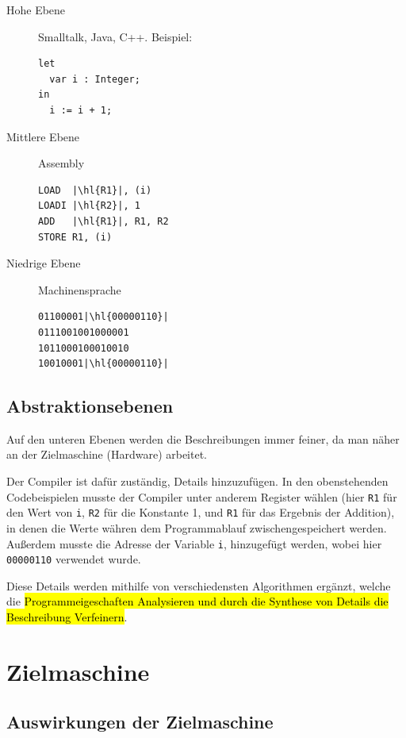 \documentclass[ngerman,abstract=true]{scrartcl}
\begin{document}
\begin{description}
\item[Hohe Ebene] Smalltalk, Java, C++. Beispiel:
\begin{lstlisting}
let
  var i : Integer;
in
  i := i + 1;
\end{lstlisting}
\item[Mittlere Ebene] Assembly
\begin{lstlisting}
LOAD  |\hl{R1}|, (i)
LOADI |\hl{R2}|, 1
ADD   |\hl{R1}|, R1, R2
STORE R1, (i)
\end{lstlisting}
\item[Niedrige Ebene] Machinensprache
\begin{lstlisting}
01100001|\hl{00000110}|
0111001001000001
1011000100010010
10010001|\hl{00000110}|
\end{lstlisting}
\end{description}

\subsection{Abstraktionsebenen}

Auf den unteren Ebenen werden die Beschreibungen immer feiner, da man näher an der Zielmaschine (Hardware) arbeitet.

Der Compiler ist dafür zuständig, Details hinzuzufügen. In den obenstehenden Codebeispielen musste der Compiler unter anderem Register wählen (hier \verb|R1| für den Wert von \verb|i|, \verb|R2| für die Konstante 1, und \verb|R1| für das Ergebnis der Addition), in denen die Werte währen dem Programmablauf zwischengespeichert werden. Außerdem musste die Adresse der Variable \verb|i|, hinzugefügt werden, wobei hier \verb|00000110| verwendet wurde.

Diese Details werden mithilfe von verschiedensten Algorithmen ergänzt, welche die \hl{Programmeigeschaften Analysieren und durch die Synthese von Details die Beschreibung Verfeinern}.

\section{Zielmaschine}

\subsection{Auswirkungen der Zielmaschine}
\end{document}
